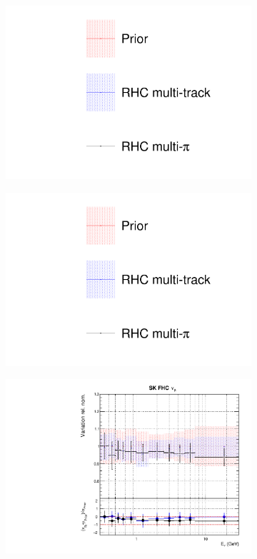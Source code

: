 \begin{figure}[t]
\centering
\begin{subfigure}{0.3\textwidth}
  \centering
  \includegraphics[width=1.0\linewidth, trim={5mm  130mm 0mm 10mm}, clip]{figs/rhcmpdat248_leg}	
\end{subfigure}
\begin{subfigure}{0.3\textwidth}
  \centering
  \includegraphics[width=1.0\linewidth, trim={5mm  0mm 0mm 70mm}, clip]{figs/rhcmpdat248_leg}	
\end{subfigure}
\begin{subfigure}{0.45\textwidth}
  \centering
  \includegraphics[width=0.75\linewidth]{figs/rhcmpasmvflux8}

\end{subfigure}
\end{figure}
